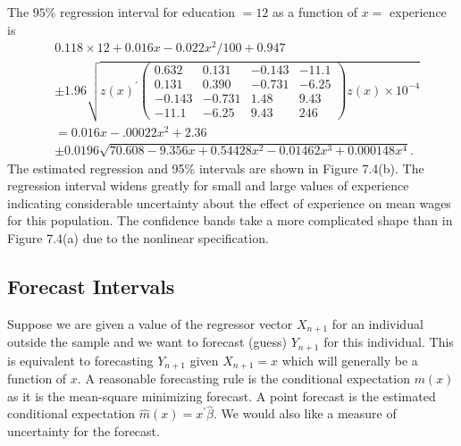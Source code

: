\documentclass[10pt]{article}
\begin{document}
The $95 \%$ regression interval for education $=12$ as a function of $x=$ experience is
$$
\begin{aligned}
& 0.118 \times 12+0.016 x-0.022 x^{2} / 100+0.947 \\
& \pm 1.96 \sqrt{z(x)^{\prime}\left(\begin{array}{cccc}0.632 & 0.131 & -0.143 & -11.1 \\0.131 & 0.390 & -0.731 & -6.25 \\-0.143 & -0.731 & 1.48 & 9.43 \\-11.1 & -6.25 & 9.43 & 246\end{array}\right) z(x) \times 10^{-4}} \\
& =0.016 x-.00022 x^{2}+2.36 \\
& \pm 0.0196 \sqrt{70.608-9.356 x+0.54428 x^{2}-0.01462 x^{3}+0.000148 x^{4}} \text {. }
\end{aligned}
$$
The estimated regression and 95\% intervals are shown in Figure 7.4(b). The regression interval widens greatly for small and large values of experience indicating considerable uncertainty about the effect of experience on mean wages for this population. The confidence bands take a more complicated shape than in Figure 7.4(a) due to the nonlinear specification.

\subsection{Forecast Intervals}
Suppose we are given a value of the regressor vector $X_{n+1}$ for an individual outside the sample and we want to forecast (guess) $Y_{n+1}$ for this individual. This is equivalent to forecasting $Y_{n+1}$ given $X_{n+1}=x$ which will generally be a function of $x$. A reasonable forecasting rule is the conditional expectation $m(x)$ as it is the mean-square minimizing forecast. A point forecast is the estimated conditional expectation $\widehat{m}(x)=x^{\prime} \widehat{\beta}$. We would also like a measure of uncertainty for the forecast.
\end{document}
